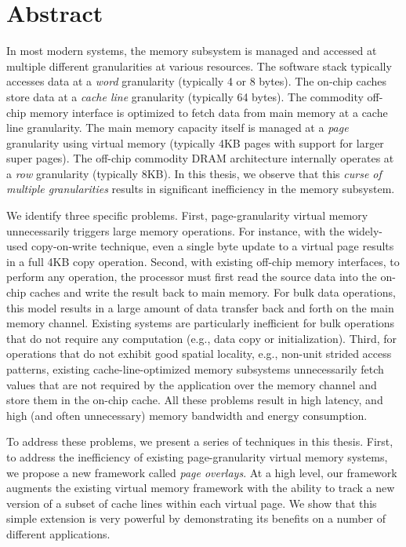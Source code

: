 \chapter*{Abstract}

In most modern systems, the memory subsystem is managed and accessed at
multiple different granularities at various resources. The software stack
typically accesses data at a \emph{word} granularity (typically 4 or 8
bytes). The on-chip caches store data at a \emph{cache line} granularity
(typically 64 bytes). The commodity off-chip memory interface is optimized
to fetch data from main memory at a cache line granularity. The main memory
capacity itself is managed at a \emph{page} granularity using virtual
memory (typically 4KB pages with support for larger super pages). The
off-chip commodity DRAM architecture internally operates at a \emph{row}
granularity (typically 8KB). In this thesis, we observe that this
\emph{curse of multiple granularities} results in significant inefficiency
in the memory subsystem.

We identify three specific problems. First, page-granularity virtual memory
unnecessarily triggers large memory operations. For instance, with the
widely-used copy-on-write technique, even a single byte update to a virtual
page results in a full 4KB copy operation. Second, with existing off-chip
memory interfaces, to perform any operation, the processor must first read
the source data into the on-chip caches and write the result back to main
memory. For bulk data operations, this model results in a large amount of
data transfer back and forth on the main memory channel. Existing systems
are particularly inefficient for bulk operations that do not require any
computation (e.g., data copy or initialization). Third, for operations that
do not exhibit good spatial locality, e.g., non-unit strided access
patterns, existing cache-line-optimized memory subsystems unnecessarily
fetch values that are not required by the application over the memory
channel and store them in the on-chip cache. All these problems result in
high latency, and high (and often unnecessary) memory bandwidth and energy
consumption.

To address these problems, we present a series of techniques in this
thesis. First, to address the inefficiency of existing page-granularity
virtual memory systems, we propose a new framework called \emph{page
  overlays}. At a high level, our framework augments the existing virtual
memory framework with the ability to track a new version of a subset of
cache lines within each virtual page. We show that this simple extension is
very powerful by demonstrating its benefits on a number of different
applications.

